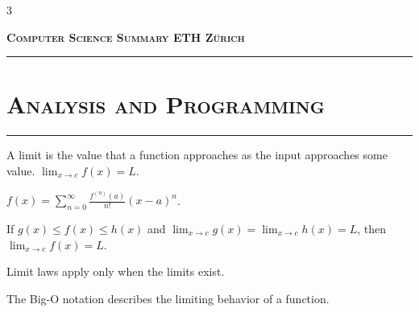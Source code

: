 
\begin{multicols*}{3}
\setlength{\columnseprule}{1pt}
\setlength{\premulticols}{1pt}
\setlength{\postmulticols}{1pt}
\setlength{\multicolsep}{1pt}
\setlength{\columnsep}{15pt}

\begin{center} %
\normalsize{\textsc{\textbf{Computer Science Summary \textendash{} ETH Zürich}}}
\rule[0pt]{\columnwidth}{1.5pt}
\end{center}
\vspace{10pt}

\section{\textsc{Analysis and Programming}}
\rule[0pt]{\columnwidth}{0.5pt}
\vspace{10pt}

\begin{definition}
    A limit is the value that a function approaches as the input approaches some value.
    $\lim_{x \to c} f(x) = L$.
\end{definition}

\begin{theorem}
    $f(x) = \sum_{n=0}^{\infty} \frac{f^{(n)}(a)}{n!} (x-a)^n$.
\end{theorem}

\begin{lemma}
    If $g(x) \leq f(x) \leq h(x)$ and $\lim_{x \to c} g(x) = \lim_{x \to c} h(x) = L$, then $\lim_{x \to c} f(x) = L$.
\end{lemma}

\begin{remark}
    Limit laws apply only when the limits exist.
\end{remark}

\begin{important}
    The Big-O notation describes the limiting behavior of a function.
\end{important}


\end{multicols*}
